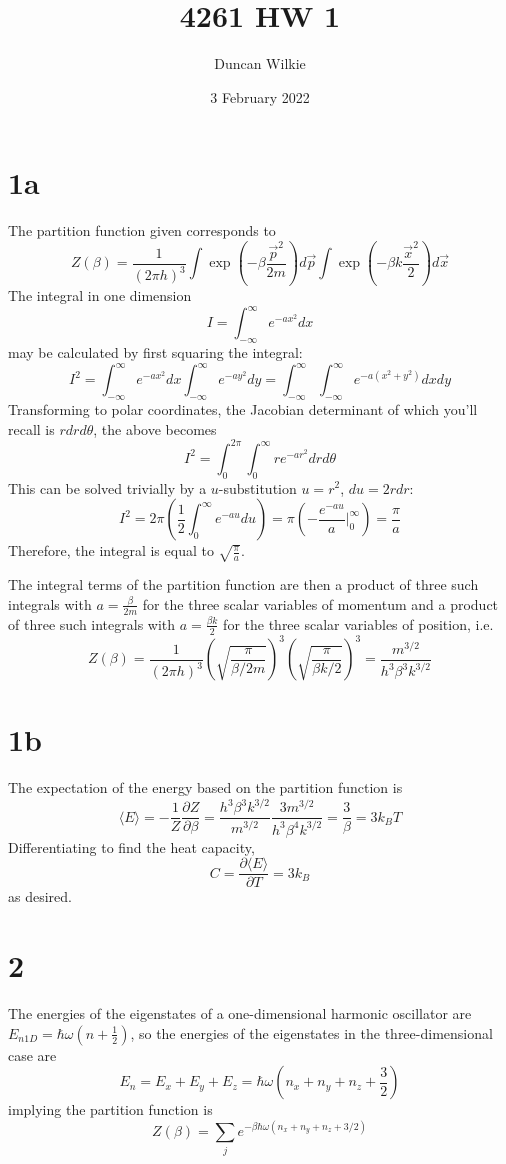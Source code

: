 \documentclass{article}
\title{4261 HW 1}
\author{Duncan Wilkie}
\date{3 February 2022}
\begin{document}
\maketitle

\section*{1a}
The partition function given corresponds to
\[Z(\beta)=\frac{1}{(2\pi h)^3}\int \exp\left( -\beta\frac{\vec{p}^2}{2m} \right)d\vec{p}\int \exp\left( -\beta k\frac{\vec{x}^2}{2} \right)d\vec{x}\]
The integral in one dimension
\[I=\int_{-\infty}^\infty e^{-ax^2}dx\]
may be calculated by first squaring the integral:
\[I^2=\int_{-\infty}^\infty e^{-ax^2}dx\int_{-\infty}^\infty e^{-ay^2}dy=\int_{-\infty}^\infty\int_{-\infty}^\infty e^{-a(x^2+y^2)}dxdy\]
Transforming to polar coordinates, the Jacobian determinant of which you'll recall is $rdrd\theta$, the above becomes
\[I^2=\int_{0}^{2\pi}\int_0^\infty re^{-ar^2}drd\theta\]
This can be solved trivially by a $u$-substitution $u=r^2$, $du=2rdr$:
\[I^2=2\pi\left( \frac{1}{2}\int_0^\infty e^{-au}du\right)=\pi\left( -\frac{e^{-au}}{a}\bigg|_0^\infty \right)=\frac{\pi}{a}\]
Therefore, the integral is equal to $\sqrt{\frac{\pi}{a}}$.

The integral terms of the partition function are then a product of three such integrals with $a=\frac{\beta}{2m}$ for the three scalar variables of momentum and a product of three such integrals with $a=\frac{\beta k}{2}$ for the three scalar variables of position, i.e.
\[Z(\beta)=\frac{1}{(2\pi h)^3}\left( \sqrt{\frac{\pi}{\beta/2m}} \right)^3\left( \sqrt{\frac{\pi}{\beta k/2}} \right)^3=\frac{m^{3/2}}{h^3\beta^3k^{3/2}}\]

\section*{1b}
The expectation of the energy based on the partition function is
\[\langle E \rangle=-\frac{1}{Z}\frac{\partial Z}{\partial \beta}=\frac{h^3\beta^3k^{3/2}}{m^{3/2}}\frac{3m^{3/2}}{h^3\beta^4k^{3/2}}=\frac{3}{\beta}=3k_BT\]
Differentiating to find the heat capacity,
\[C=\frac{\partial \langle E \rangle}{\partial T}=3k_B\]
as desired.

\section*{2}
The energies of the eigenstates of a one-dimensional harmonic oscillator are $E_{n1D}=\hbar\omega(n+\frac{1}{2})$, so the energies of the eigenstates in the three-dimensional case are
\[E_n=E_x+E_y+E_z=\hbar\omega\left(n_x+n_y+n_z+\frac{3}{2}\right)\]
implying the partition function is
\[Z(\beta)=\sum_je^{-\beta\hbar\omega\left( n_x+n_y+n_z+3/2 \right)}\]
\end{document}
